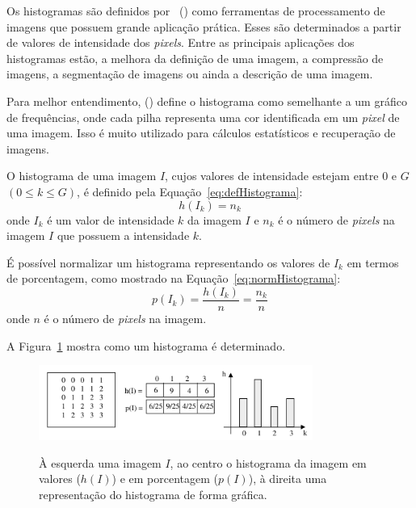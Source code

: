 Os histogramas são definidos por~\citeauthor{marengoni2009tutorial} (\citeyear{marengoni2009tutorial}) como ferramentas de processamento de imagens que possuem grande aplicação prática. Esses são determinados a partir de valores de intensidade dos \textit{pixels}. Entre as principais aplicações dos histogramas estão, a melhora da definição de uma imagem, a compressão de imagens, a segmentação de imagens ou ainda a descrição de uma imagem.

Para melhor entendimento, \citeauthor{hoshiro2008processamento} (\citeyear{hoshiro2008processamento}) define o histograma como semelhante a um gráfico de frequências, onde cada pilha representa uma cor identificada em um \textit{pixel} de uma imagem. Isso é muito utilizado para cálculos estatísticos e recuperação de imagens.

O histograma de uma imagem $I$, cujos valores de intensidade estejam entre $0$ e $G$ $(0\leq k\leq G)$, é definido pela Equação~\ref{eq:defHistograma}:
\begin{equation}
\label{eq:defHistograma}
    h(I_k) = n_k
\end{equation}
onde $I_k$ é um valor de intensidade $k$ da imagem $I$ e $n_k$ é o número de \textit{pixels} na imagem $I$ que possuem a intensidade $k$.

É possível normalizar um histograma representando os valores de $I_k$ em termos de porcentagem, como mostrado na Equação~\ref{eq:normHistograma}:
\begin{equation}
\label{eq:normHistograma}
    p(I_k) = \frac{h(I_k)}{n} = \frac{n_k}{n}
\end{equation}
onde $n$ é o número de \textit{pixels} na imagem.

A Figura~\ref{fig:modeloHistrograma} mostra como um histograma é determinado.

\begin{figure}[!hbtp]
  \centering
   \caption{À esquerda uma imagem $I$, ao centro o histograma da imagem em valores ($h(I)$) e em porcentagem ($p(I)$), à direita uma representação do histograma de forma gráfica.}
    \includegraphics[width = 0.8\textwidth]{Caps/Figs/ref-teorico/histogram.png}
   \label{fig:modeloHistrograma}
\end{figure}


